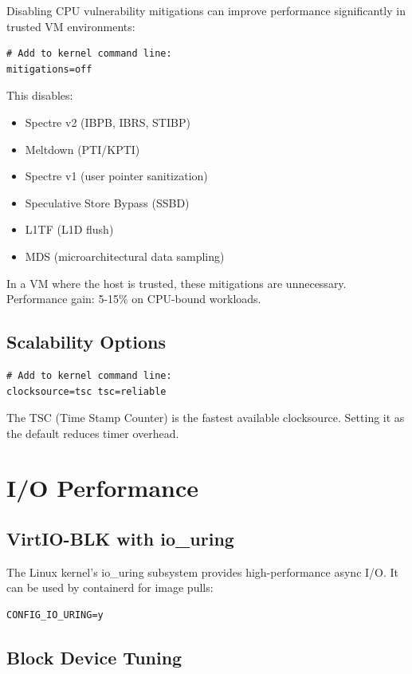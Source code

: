 Disabling CPU vulnerability mitigations can improve performance
significantly in trusted VM environments:

\begin{lstlisting}
# Add to kernel command line:
mitigations=off
\end{lstlisting}

This disables:
\begin{itemize}[nosep]
  \item Spectre v2 (IBPB, IBRS, STIBP)
  \item Meltdown (PTI/KPTI)
  \item Spectre v1 (user pointer sanitization)
  \item Speculative Store Bypass (SSBD)
  \item L1TF (L1D flush)
  \item MDS (microarchitectural data sampling)
\end{itemize}

In a VM where the host is trusted, these mitigations are unnecessary.
Performance gain: 5-15\% on CPU-bound workloads.

\subsection{Scalability Options}

\begin{lstlisting}
# Add to kernel command line:
clocksource=tsc tsc=reliable
\end{lstlisting}

The TSC (Time Stamp Counter) is the fastest available clocksource.
Setting it as the default reduces timer overhead.

\section{I/O Performance}

\subsection{VirtIO-BLK with io\_uring}

The Linux kernel's io\_uring subsystem provides high-performance async
I/O. It can be used by containerd for image pulls:

\begin{lstlisting}
CONFIG_IO_URING=y
\end{lstlisting}

\subsection{Block Device Tuning}

